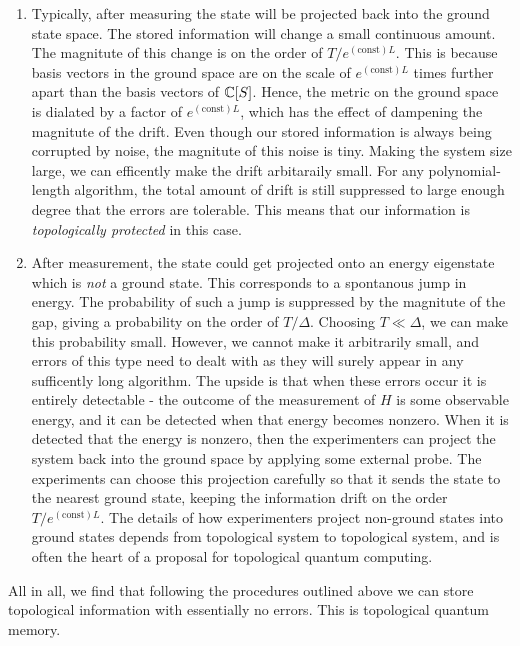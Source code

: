 \begin{enumerate}
\item Typically, after measuring the state will be projected back into the ground state space. The stored information will change a small continuous amount. The magnitute of this change is on the order of $T/e^{(\text{const})L}$. This is because basis vectors in the ground space are on the scale of $e^{(\text{const})L}$ times further apart than the basis vectors of $\mathbb{C}[S]$. Hence, the metric on the ground space is dialated by a factor of $e^{(\text{const})L}$, which has the effect of dampening the magnitute of the drift. Even though our stored information is always being corrupted by noise, the magnitute of this noise is tiny. Making the system size large, we can efficently make the drift arbitaraily small. For any polynomial-length algorithm, the total amount of drift is still suppressed to large enough degree that the errors are tolerable. This means that our information is \textit{topologically protected} in this case.

\item After measurement, the state could get projected onto an energy eigenstate which is \textit{not} a ground state. This corresponds to a spontanous jump in energy. The probability of such a jump is suppressed by the magnitute of the gap, giving a probability on the order of $T/\Delta$. Choosing $T\ll \Delta$, we can make this probability small. However, we cannot make it arbitrarily small, and errors of this type need to dealt with as they will surely appear in any sufficently long algorithm. The upside is that when these errors occur it is entirely detectable - the outcome of the measurement of $H$ is some observable energy, and it can be detected when that energy becomes nonzero. When it is detected that the energy is nonzero, then the experimenters can project the system back into the ground space by applying some external probe. The experiments can choose this projection carefully so that it sends the state to the nearest ground state, keeping the information drift on the order $T/e^{(\text{const})L}$. The details of how experimenters project non-ground states into ground states depends from topological system to topological system, and is often the heart of a proposal for topological quantum computing.
\end{enumerate}

All in all, we find that following the procedures outlined above we can store topological information with essentially no errors. This is topological quantum memory.

